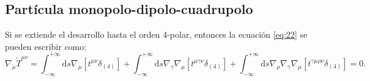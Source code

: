 \subsection{Partícula monopolo-dipolo-cuadrupolo}

Si se extiende el desarrollo hasta el orden 4-polar, entonces la ecuación \eqref{eq:22} se pueden escribir como:
\begin{equation}
\label{eq:48}
\nabla_{\mu} \tilde{T}^{\mu \nu} = \int_{-\infty}^{+\infty} \mathrm{d}s \nabla_{\mu} [ t^{\mu \nu} \delta_{(4)}] + \int_{-\infty}^{+\infty} \mathrm{d}s \nabla_{\gamma}\nabla_{\mu} [ t^{\mu \gamma \nu} \delta_{(4)}] + \int_{-\infty}^{+\infty} \mathrm{d}s \nabla_{\rho} \nabla_{\gamma} \nabla_{\mu} [ t^{\gamma \mu \rho \nu} \delta_{(4)}] = 0.
\end{equation}

